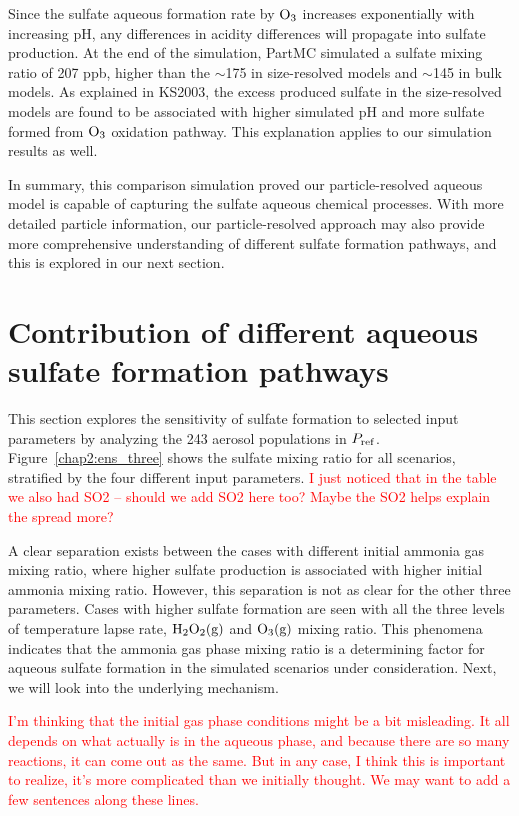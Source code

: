 \documentclass[edeposit,fullpage]{uiucthesis2009}
\begin{document}
Since the sulfate aqueous formation rate by $\rm O_3$ increases
exponentially with increasing pH, any differences in acidity
differences will propagate into sulfate production. At the end of the
simulation, PartMC simulated a sulfate mixing ratio of 207 ppb, higher
than the $\sim$175 in size-resolved models and $\sim$145 in bulk
models. As explained in KS2003, the excess produced sulfate in the
size-resolved models are found to be associated with higher simulated
pH and more sulfate formed from $\rm O_3$ oxidation pathway. This
explanation applies to our simulation results as well.

In summary, this comparison simulation proved our particle-resolved
aqueous model is capable of capturing the sulfate aqueous chemical
processes.  With more detailed particle information, our
particle-resolved approach may also provide more comprehensive
understanding of different sulfate formation pathways, and this is
explored in our next section.
\section{Contribution of different aqueous sulfate formation pathways}
\label{chap2.4}
This section explores the sensitivity of sulfate formation to selected
input parameters by analyzing the 243 aerosol populations in $P_{\rm
  ref}$.  Figure~\ref{chap2:ens_three} shows the sulfate mixing ratio
for all scenarios, stratified by the four different input parameters.
\textcolor{red}{I just noticed that in the table we also had SO2 --
  should we add SO2 here too? Maybe the SO2 helps explain the spread
  more?}

A clear separation exists between the cases with different initial
ammonia gas mixing ratio, where higher sulfate production is
associated with higher initial ammonia mixing ratio. However, this
separation is not as clear for the other three parameters. Cases with
higher sulfate formation are seen with all the three levels of
temperature lapse rate, $\rm H_2O_2(g)$ and $\rm O_3(g)$ mixing
ratio. This phenomena indicates that the ammonia gas phase mixing
ratio is a determining factor for aqueous sulfate formation in the
simulated scenarios under consideration. Next, we will look into the
underlying mechanism.

\textcolor{red}{I'm thinking that the initial gas phase conditions
  might be a bit misleading. It all depends on what actually is in the
  aqueous phase, and because there are so many reactions, it can come
  out as the same. But in any case, I think this is important to
  realize, it's more complicated than we initially thought. We may
  want to add a few sentences along these lines.}
\end{document}
